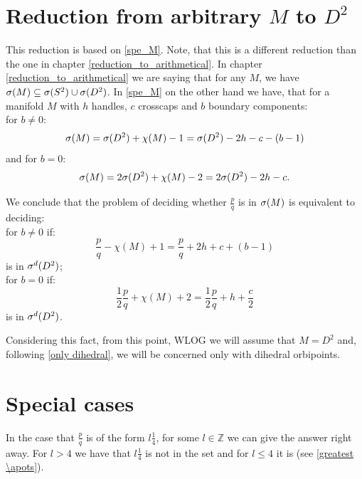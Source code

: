 \section{Reduction from arbitrary $M$ to $D^2$}\label{algorithm reduction to D2}
This reduction is based on \ref{spe_M}.
Note, that this is a different reduction than the one in chapter \ref{reduction_to_arithmetical}. 
In chapter \ref{reduction_to_arithmetical} we are saying that for any $M$, we have ${{\sigma}(M)} 
\subseteq {{\sigma}(S^2)} \cup {{\sigma}(D^2)}$. In \ref{spe_M} on the other hand we have, that 
for a manifold $M$ with $h$ handles, $c$ crosscaps and $b$ boundary components: \\
for $b \neq 0$:
\begin{equation}
{\sigma}(M) = {{\sigma}(D^2)} + \chi(M) -1 = {{\sigma}(D^2)} - 2h - c - (b - 1)
\end{equation}
and for $b = 0$:
\begin{equation}
{\sigma}(M) = 2{{\sigma}(D^2)} + \chi(M) - 2 = 2{{\sigma}(D^2)} - 2h - c.
\end{equation}  


We conclude that the problem of deciding whether $\frac{p}{q}$ is in ${\sigma}(M)$
is equivalent to deciding: \\
for $b \neq 0$ if:
\begin{equation}\label{translation with b not 0}
\frac{p}{q} - \chi(M) + 1 = \frac{p}{q} + 2h + c + (b-1) 
\end{equation} 
is in ${\sigma^d(D^2)}$; \\
for $b = 0$ if:
\begin{equation}\label{translation with b 0}
\frac{1}{2}\frac{p}{q} + \chi(M) + 2 = \frac{1}{2}\frac{p}{q}+h+\frac{c}{2}
\end{equation}
is in ${\sigma^d(D^2)}$.

Considering this fact, from this point, WLOG we will assume that $M = D^2$ and, 
following \ref{only dihedral}, we will 
be concerned only with dihedral orbipoints.


\section{Special cases}
In the case that $\frac{p}{q}$ is of the form $l\frac{1}{4}$, for some $l \in \mathbb{Z}$ 
we can give the answer right away. For $l > 4$ we have that $l\frac{1}{4}$ is not in the set 
and for $l \leq 4$ it is (see \ref{greatest \apots}). 

